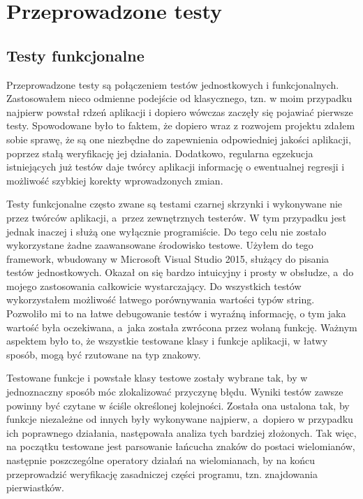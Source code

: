 \chapter{Przeprowadzone testy}

\section{Testy funkcjonalne}

Przeprowadzone testy są połączeniem testów jednostkowych i funkcjonalnych. Zastosowałem nieco odmienne podejście od klasycznego, tzn. w moim przypadku najpierw powstał rdzeń aplikacji i dopiero wówczas zaczęły się pojawiać pierwsze testy. Spowodowane było to faktem, że dopiero wraz z rozwojem projektu zdałem sobie sprawę, że są one niezbędne do zapewnienia odpowiedniej jakości aplikacji, poprzez stałą weryfikację jej działania. Dodatkowo, regularna egzekucja istniejących już testów daje twórcy aplikacji informację o ewentualnej regresji i możliwość szybkiej korekty wprowadzonych zmian.

Testy funkcjonalne często zwane są testami czarnej skrzynki i wykonywane nie przez twórców aplikacji, a~przez zewnętrznych testerów. W tym przypadku jest jednak inaczej i służą one wyłącznie programiście. Do tego celu nie zostało wykorzystane żadne zaawansowane środowisko testowe. Użyłem do tego framework, wbudowany w Microsoft Visual Studio 2015, służący do pisania testów jednostkowych. Okazał on się bardzo intuicyjny i prosty w obsłudze, a~do mojego zastosowania całkowicie wystarczający. Do wszystkich testów wykorzystałem możliwość łatwego porównywania wartości typów string. Pozwoliło mi to na łatwe debugowanie testów i wyraźną informację, o tym jaka wartość była oczekiwana, a~jaka została zwrócona przez wołaną funkcję. Ważnym aspektem było to, że wszystkie testowane klasy i funkcje aplikacji, w łatwy sposób, mogą być rzutowane na typ znakowy.

Testowane funkcje i powstałe klasy testowe zostały wybrane tak, by w jednoznaczny sposób móc zlokalizować przyczynę błędu. Wyniki testów zawsze powinny być czytane w ściśle określonej kolejności. Została ona ustalona tak, by funkcje niezależne od innych były wykonywane najpierw, a~dopiero w przypadku ich poprawnego działania, następowała analiza tych bardziej złożonych. Tak więc, na początku testowane jest parsowanie łańcucha znaków do postaci wielomianów, następnie poszczególne operatory działań na wielomianach, by na końcu przeprowadzić weryfikację zasadniczej części programu, tzn. znajdowania pierwiastków.


